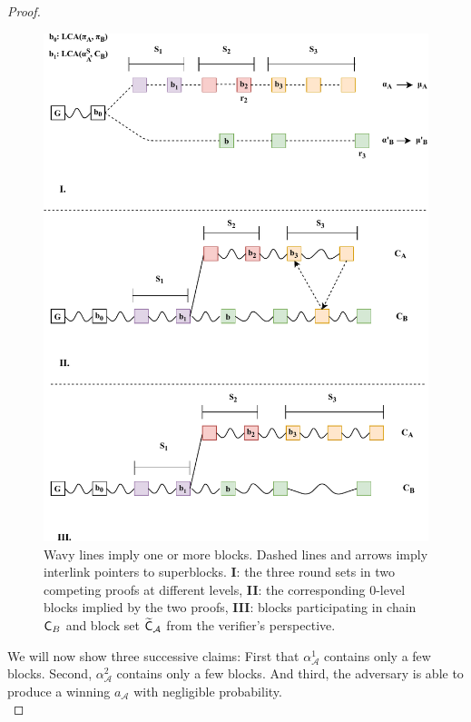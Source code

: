\begin{proof}
\begin{figure}[h!]
    \begin{center}
        \includegraphics[width=\columnwidth]{figures/proof_velvet-crop.pdf}
    \end{center}
    \caption{Wavy lines imply one or more blocks. Dashed lines and arrows imply interlink pointers to superblocks. \textbf{I}: the three round sets in two competing proofs at different levels, \textbf{II}: the corresponding 0-level blocks implied by the two proofs, \textbf{III}: blocks participating in chain $\mathsf{C}_B$ and block set $\widetilde{\mathsf{C}}_\mathcal{A}$ from the verifier's perspective.}
    \label{fig:proof_velvet}
\end{figure}

We will now show three successive claims: First that $\alpha_\mathcal{A}^1$ contains only a few blocks. Second,  $\alpha_\mathcal{A}^2$ contains only a few blocks. And third, the adversary is able to produce a winning $a_\mathcal{A}$ with negligible probability.\\


\end{proof}
